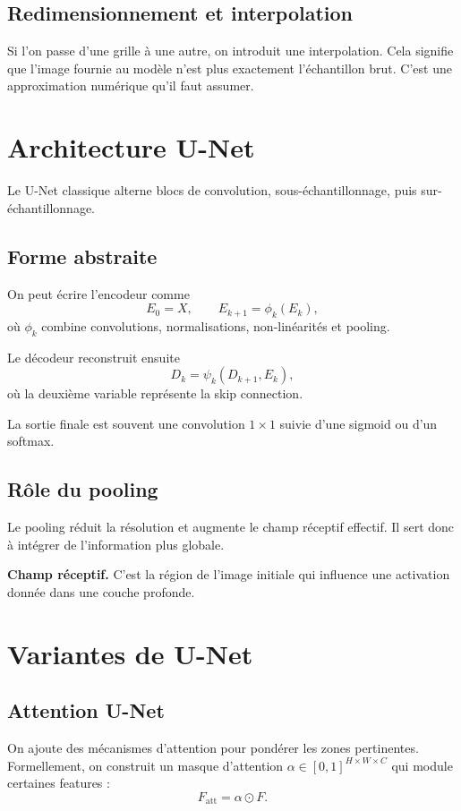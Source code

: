 \documentclass[11pt]{article}
\begin{document}
\subsection{Redimensionnement et interpolation}
Si l'on passe d'une grille à une autre, on introduit une interpolation. Cela signifie que l'image fournie au modèle n'est plus exactement l'échantillon brut. C'est une approximation numérique qu'il faut assumer.

\section{Architecture U-Net}
Le U-Net classique alterne blocs de convolution, sous-échantillonnage, puis sur-échantillonnage.

\subsection{Forme abstraite}
On peut écrire l'encodeur comme
\[
E_0=X,
\qquad E_{k+1}=\phi_k(E_k),
\]
où $\phi_k$ combine convolutions, normalisations, non-linéarités et pooling.

Le décodeur reconstruit ensuite
\[
D_{k}=\psi_k(D_{k+1}, E_k),
\]
où la deuxième variable représente la skip connection.

La sortie finale est souvent une convolution $1\times 1$ suivie d'une sigmoid ou d'un softmax.

\subsection{Rôle du pooling}
Le pooling réduit la résolution et augmente le champ réceptif effectif. Il sert donc à intégrer de l'information plus globale.

\begin{mathBox}
\textbf{Champ réceptif.} C'est la région de l'image initiale qui influence une activation donnée dans une couche profonde.
\end{mathBox}

\section{Variantes de U-Net}
\subsection{Attention U-Net}
On ajoute des mécanismes d'attention pour pondérer les zones pertinentes. Formellement, on construit un masque d'attention $\alpha\in[0,1]^{H\times W\times C}$ qui module certaines features :
\[
F_{\text{att}} = \alpha \odot F.
\]
\end{document}
